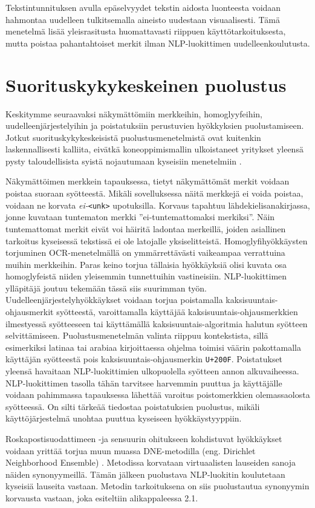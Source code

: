 Tekstintunnituksen avulla epäselvyydet tekstin aidosta luonteesta voidaan hahmontaa uudelleen tulkitsemalla aineisto uudestaan visuaalisesti. Tämä menetelmä lisää yleisrasitusta huomattavasti riippuen käyttötarkoituksesta, mutta poistaa pahantahtoiset merkit ilman NLP-luokittimen uudelleenkoulutusta. \citep{boucher2021bad}

\section{Suorituskykykeskeinen puolustus}
Keskitymme seuraavaksi näkymättömiin merkkeihin, homoglyyfeihin, uudelleenjärjestelyihin ja poistatuksiin perustuvien hyökkyksien puolustamiseen. Jotkut suorituskykykeskeisistä puolustusmenetelmistä ovat kuitenkin laskennallisesti kalliita, eivätkä koneoppimismallin ulkoistaneet yritykset yleensä pysty taloudellisista syistä nojautumaan kyseisiin menetelmiin \citep{https://doi.org/10.48550/arxiv.1911.07399}.

Näkymättöimen merkkein tapauksessa, tietyt näkymättömät merkit voidaan poistaa suoraan syötteestä. Mikäli sovelluksessa näitä merkkejä ei voida poistaa, voidaan ne korvata \textit{ei-}\texttt{<unk>} upotuksilla. Korvaus tapahtuu lähdekielisanakirjassa, jonne kuvataan tuntematon merkki ''ei-tuntemattomaksi merkiksi''. Näin tuntemattomat merkit eivät voi häiritä ladontaa merkeillä, joiden asiallinen tarkoitus kyseisessä tekstissä ei ole latojalle yksiselitteistä. Homoglyfihyökkäysten torjuminen OCR-menetelmällä on ymmärrettävästi vaikeampaa verrattuina muihin merkkeihin. Paras keino torjua tällaisia hyökkäyksiä olisi kuvata osa homoglyfeistä niiden yleisemmin tunnettuihin vastineisiin. NLP-luokittimen ylläpitäjä joutuu tekemään tässä siis suurimman työn. Uudelleenjärjestelyhyökkäykset voidaan torjua poistamalla kaksisuuntais-ohjausmerkit syötteestä, varoittamalla käyttäjää kaksisuuntais-ohjausmerkkien ilmestyessä syötteeseen tai käyttämällä kaksisuuntais-algoritmia halutun syötteen selvittämiseen. Puolustusmenetelmän valinta riippuu kontekstista, sillä esimerkiksi latinaa tai arabiaa kirjoittaessa ohjelma toimisi väärin pakottamalla käyttäjän syötteestä pois kaksisuuntais-ohjausmerkin \texttt{U+200F}. Poistatukset yleensä havaitaan NLP-luokittimien ulkopuolella syötteen annon alkuvaiheessa. NLP-luokittimen tasolla tähän tarvitsee harvemmin puuttua ja käyttäjälle voidaan pahimmassa tapauksessa lähettää varoitus poistomerkkien olemassaolosta syötteessä. On silti tärkeää tiedostaa poistatuksien puolustus, mikäli käyttöjärjestelmä unohtaa puuttua kyseiseen hyökkäystyyppiin. \citep{boucher2021bad}

Roskapostisuodattimeen -ja sensuurin ohitukseen kohdistuvat hyökkäykset voidaan yrittää torjua muun muassa DNE-metodilla (eng. Dirichlet Neighborhood Ensemble) \citep{dnedefense}. Metodissa korvataan virtuaalisten lauseiden sanoja näiden synonyymeillä. Tämän jälkeen puolustava NLP-luokitin koulutetaan kyseisiä lauseita vastaan. Metodin tarkoituksena on siis puolustautua synonyymin korvausta vastaan, joka esiteltiin alikappaleessa 2.1.